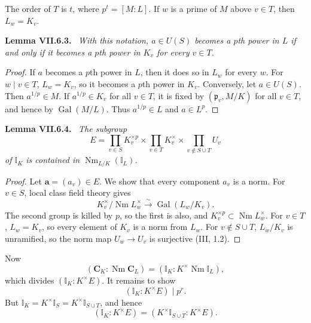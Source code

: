 \documentclass[11pt]{article}
\newcommand{\I}{\mathbb I}
\newcommand{\C}{\mathbf C}
\newcommand{\Nm}{\operatorname{Nm}}
\newcommand{\Gal}{\operatorname{Gal}}
\newenvironment{authorresult}[2]{\par\medskip\noindent\textbf{#1 VII.#2.}\ \itshape}{\par\medskip}
\begin{document}
The order of $T$ is $t$, where $p^t=[M:L]$. If $w$ is a prime of $M$ above
$v\in T$, then $L_w=K_v$.
\begin{authorresult}{Lemma}{6.3}
With this notation, $a\in U(S)$ becomes a $p$th power in $L$ if and only if
it becomes a $p$th power in $K_v$ for every $v\in T$.
\end{authorresult}
\begin{proof}
If $a$ becomes a $p$th power in $L$, then it does so in $L_w$ for every $w$.
For $w\mid v\in T$, $L_w=K_v$, so it becomes a $p$th power in $K_v$.
Conversely, let $a\in U(S)$. Then $a^{1/p}\in M$. If $a^{1/p}\in K_v$
for all $v\in T$, it is fixed by $(\mathfrak p_v,M/K)$ for all $v\in T$,
and hence by $\Gal(M/L)$. Thus $a^{1/p}\in L$ and $a\in L^p$.
\end{proof}

\begin{authorresult}{Lemma}{6.4}
The subgroup
\[
 E=\prod_{v\in S}K_v^{\times p}\times
   \prod_{v\in T}K_v^{\times}\times
   \prod_{v\notin S\cup T}U_v
\]
of $\I_K$ is contained in $\Nm_{L/K}(\I_L)$.
\end{authorresult}
\begin{proof}
Let $\mathbf a=(a_v)\in E$. We show that every component $a_v$ is a norm.
For $v\in S$, local class field theory gives
\[
 K_v^\times/\Nm L_w^\times\xrightarrow{\sim}\Gal(L_w/K_v).
\]
The second group is killed by $p$, so the first is also, and
$K_v^{\times p}\subset\Nm L_w^\times$.
For $v\in T$, $L_w=K_v$, so every element of $K_v$ is a norm from $L_w$.
For $v\notin S\cup T$, $L_w/K_v$ is unramified, so the norm map
$U_w\longrightarrow U_v$ is surjective (III, 1.2).
\end{proof}

Now
\[
 (\C_K:\Nm\C_L)=(\I_K:K^\times\Nm\I_L),
\]
which divides $(\I_K:K^\times E)$. It remains to show
\[
 \boxed{(\I_K:K^\times E)\mid p^r.}
\]
But $\I_K=K^\times\I_S=K^\times\I_{S\cup T}$, and hence
\[
 (\I_K:K^\times E)=(K^\times\I_{S\cup T}:K^\times E).
\]
\end{document}
